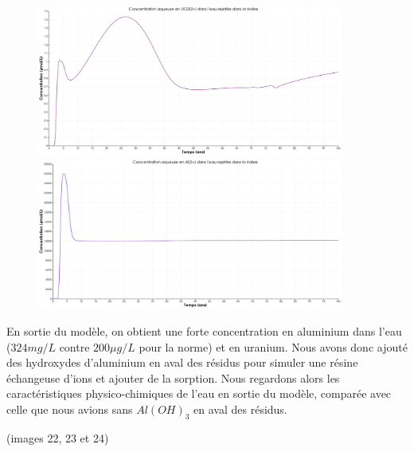 \documentclass{article}
\begin{document}
\begin{figure}[H]
    \centering
    \begin{minipage}{0.5\textwidth}
        \centering
        \includegraphics[width=0.9\textwidth]{III_B_2_20.png} 
        \caption{}
        \label{fig:UO2_riviere_Al}
    \end{minipage}\hfill
    \begin{minipage}{0.5\textwidth}
        \centering
        \includegraphics[width=0.9\textwidth]{III_B_2_21.png} 
        \caption{}
        \label{fig:Al_riviere_Al}
    \end{minipage}
\end{figure}


En sortie du modèle, on obtient une forte concentration en aluminium dans l’eau ($324 mg/L$ contre $200 \mu g/L$ pour la norme) et en uranium. Nous avons donc ajouté des hydroxydes d’aluminium en aval des résidus pour simuler une résine échangeuse d’ions et ajouter de la sorption.
Nous regardons alors les caractéristiques physico-chimiques de l’eau en sortie du modèle, comparée avec celle que nous avions sans $Al(OH)_3$ en aval des résidus.

(images 22, 23 et 24)
\end{document}
